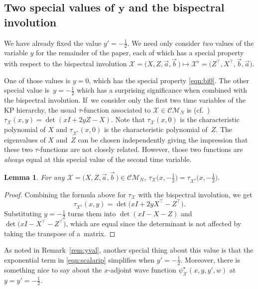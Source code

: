 \documentclass[pdftex]{sigma}
\numberwithin{equation}{section}
\newtheorem{Lemma}[Theorem]{Lemma}
\theoremstyle{definition}
\def\psistar{\psi^{\star}}
\def\X{\mathcal{X}}
\def\CM{\mathcal{C\!M}}
\begin{document}
\subsection[Two special values of y and the bispectral involution]{Two special values of $\boldsymbol{y}$ and the bispectral involution}

We have already fixed the value $y'=-\frac{1}{2}$. We need
only consider \textit{two} values of the variable $y$ for the
remainder of the paper, each of which has a special property with
respect to the bispectral involution $\X=\bigl(X,Z,\vec a,\vec b\,\bigr)\mapsto
\X^{\flat}=\bigl(Z^{\top},X^{\top},\vec b,\vec a\bigr)$.

One of those values is $y=0$, which has the special property
\eqref{eqn:bi0}.
The other special value is~${y=-\tfrac{1}{2}}$ which has a surprising
significance when combined with the bispectral involution.
If~we consider only the first two time variables of the KP hierarchy,
the usual $\tau$-function associated to $\X\in\CM_N$ is (cf.~\cite{WilsonCM})
$
\tau_{\X}(x,y)=\det(xI+2yZ-X)$.
Note that $\tau_{\X}(x,0)$ is the characteristic polynomial of
 $X$ and $\tau_{\X^{\flat}}(x,0)$ is the characteristic polynomial of~$Z$. The eigenvalues of $X$ and~$Z$ can be chosen independently
giving the impression that these two $\tau$-functions are not closely related.
However, those two functions are \textit{always} equal at this
 special value of the second time variable.

\begin{Lemma}\label{lem:weirdfact}
For any $\X=\bigl(X,Z,\vec a,\vec b\,\bigr)\in\CM_N$,
 $
 \tau_{\X}\bigl(x,-\frac{1}{2}\bigr)=\tau_{\X^\flat}\bigl(x,-\frac{1}{2}\bigr).
 $\end{Lemma}
 \begin{proof}
Combining the formula above for $\tau_{\X}$ with the bispectral
involution, we get
\[\tau_{\X^\flat}(x,y)=\det\bigl(x I+2y{X}^\top-{Z}^\top\bigr).\]
Substituting $y=-\tfrac{1}{2}$ turns them into
$\det(xI-X-Z)$ and $\det\bigl(xI-X^{\top}-Z^{\top}\bigr)$, which are equal since
the determinant is not affected by taking the transpose of a~matrix.
\end{proof}

As noted in Remark~\ref{rem:yval}, another special
thing about this value is that the exponential term in
\eqref{eqn:scalarip} simplifies when $y'=-\tfrac{1}{2}$. Moreover, there is something nice
to say about the $x$-adjoint wave function
$\psistar_{\X}(x,y,y',w)$ at $y=y'=-\tfrac{1}{2}$.
\end{document}
